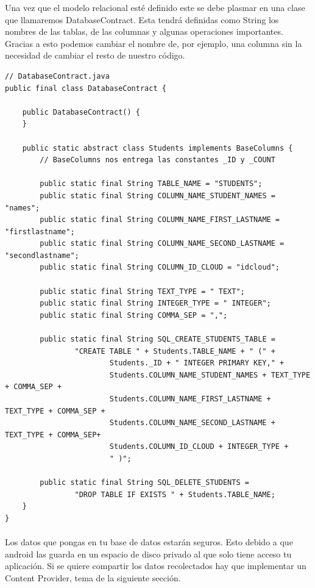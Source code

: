 \documentclass[10pt]{extarticle}
\begin{document}
Una vez que el modelo relacional esté definido este se debe plasmar en una clase que llamaremos DatabaseContract. Esta tendrá definidas como String los nombres de las tablas, de las columnas y algunas operaciones importantes. Gracias a esto podemos cambiar el nombre de, por ejemplo, una columna sin la necesidad de cambiar el resto de nuestro código.
\\
\begin{lstlisting}
// DatabaseContract.java
public final class DatabaseContract {

    public DatabaseContract() {
    }

    public static abstract class Students implements BaseColumns {
		// BaseColumns nos entrega las constantes _ID y _COUNT
		
        public static final String TABLE_NAME = "STUDENTS";
        public static final String COLUMN_NAME_STUDENT_NAMES = "names";
        public static final String COLUMN_NAME_FIRST_LASTNAME = "firstlastname";
        public static final String COLUMN_NAME_SECOND_LASTNAME = "secondlastname";
        public static final String COLUMN_ID_CLOUD = "idcloud";

        public static final String TEXT_TYPE = " TEXT";
        public static final String INTEGER_TYPE = " INTEGER";
        public static final String COMMA_SEP = ",";

        public static final String SQL_CREATE_STUDENTS_TABLE =
                "CREATE TABLE " + Students.TABLE_NAME + " (" +
                        Students._ID + " INTEGER PRIMARY KEY," +
                        Students.COLUMN_NAME_STUDENT_NAMES + TEXT_TYPE + COMMA_SEP +
                        Students.COLUMN_NAME_FIRST_LASTNAME + TEXT_TYPE + COMMA_SEP +
                        Students.COLUMN_NAME_SECOND_LASTNAME + TEXT_TYPE + COMMA_SEP+
                        Students.COLUMN_ID_CLOUD + INTEGER_TYPE +
                        " )";

        public static final String SQL_DELETE_STUDENTS =
                "DROP TABLE IF EXISTS " + Students.TABLE_NAME;
    }
}
\end{lstlisting}

\paragraph{}
Los datos que pongas en tu base de datos estarán seguros. Esto debido a que android las guarda en un espacio de disco privado al que solo tiene acceso tu aplicación. Si se quiere compartir los datos recolectados hay que implementar un Content Provider, tema de la siguiente sección.
\end{document}
